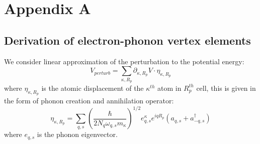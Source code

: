 \documentclass{article}
\begin{document}
\pagebreak
\section*{Appendix A}
\subsection{Derivation of electron-phonon vertex elements}
We consider linear approximation of the perturbation to the potential energy:
\begin{equation}
    V_{perturb} = \sum_{\kappa, R_p} \partial_{\kappa, R_p}V \cdot \eta_{\kappa, R_p}
\end{equation}
where $\eta_{\kappa, R_p}$ is the atomic displacement of the $\kappa^{th}$ atom in $R_p^{th}$ cell, this is 
given in the form of phonon creation and annihilation operator:
\begin{equation}
    \eta_{\kappa, R_p} = \sum_{q,s} \left( \frac{\hbar}{2N_q \omega_{q,s} m_{\kappa}} \right)^{1/2} e_{q,s}^{\kappa} e^{iqR_p} (a_{q,s} + a_{-q,s}^{\dagger}) \label{eta}
\end{equation}
where $e_{q,s}$ is the phonon eigenvector. 
\end{document}
